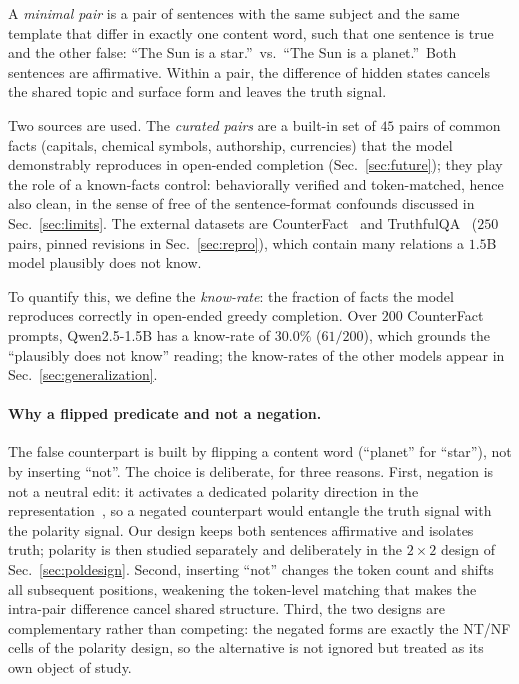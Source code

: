 \documentclass[11pt]{article}
\begin{document}
A \emph{minimal pair} is a pair of sentences with the same subject and the
same template that differ in exactly one content word, such that one sentence
is true and the other false: ``The Sun is a star.''\ vs.\ ``The Sun is a
planet.''\ Both sentences are affirmative. Within a pair, the difference of
hidden states cancels the shared topic and surface form and leaves the truth
signal.

Two sources are used. The \emph{curated pairs} are a built-in set of $45$
pairs of common facts (capitals, chemical symbols, authorship, currencies)
that the model demonstrably reproduces in open-ended completion
(Sec.~\ref{sec:future}); they play the role of a known-facts control:
behaviorally verified and token-matched, hence also clean, in the sense of
free of the sentence-format confounds discussed in Sec.~\ref{sec:limits}.
The external datasets are CounterFact~\cite{counterfact} and
TruthfulQA~\cite{truthfulqa} ($250$ pairs, pinned revisions in
Sec.~\ref{sec:repro}), which contain many relations a $1.5$B model plausibly
does not know.

To quantify this, we define the \emph{know-rate}: the fraction of facts the
model reproduces correctly in open-ended greedy completion. Over $200$
CounterFact prompts, Qwen2.5-1.5B has a know-rate of $30.0\%$ ($61/200$),
which grounds the ``plausibly does not know'' reading; the know-rates of the
other models appear in Sec.~\ref{sec:generalization}.


\paragraph{Why a flipped predicate and not a negation.} The false counterpart
is built by flipping a content word (``planet'' for ``star''), not by
inserting ``not''. The choice is deliberate, for three reasons. First,
negation is not a neutral edit: it activates a dedicated polarity direction in
the representation~\cite{burger2024}, so a negated counterpart would entangle
the truth signal with the polarity signal. Our design keeps both sentences
affirmative and isolates truth; polarity is then studied separately and
deliberately in the $2{\times}2$ design of Sec.~\ref{sec:poldesign}. Second,
inserting ``not'' changes the token count and shifts all subsequent positions,
weakening the token-level matching that makes the intra-pair difference
cancel shared structure. Third, the two designs are complementary rather than
competing: the negated forms are exactly the NT/NF cells of the polarity
design, so the alternative is not ignored but treated as its own object of
study.
\end{document}
